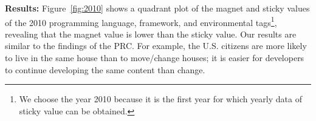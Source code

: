\documentclass[conference]{IEEEtran}
\begin{document}





\noindent \textbf{Results:}
Figure~\ref{fig:2010} shows a quadrant plot of the magnet and sticky values ​​of the 2010 programming language, framework, and environmental tags\footnote{We choose the year 2010 because it is the first year for which yearly data of sticky value can be obtained.}, revealing that the magnet value is lower than the sticky value. Our results are similar to the findings of the PRC. For example, the U.S. citizens are more likely to live in the same house than to move/change houses; it is easier for developers to continue developing the same content than change.
 
\end{document}
